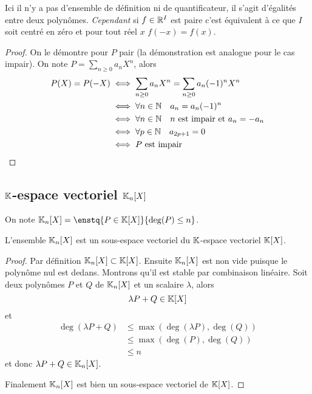 \danger Ici il n'y a pas d'ensemble de définition ni de quantificateur, il s'agit d'égalités entre deux polynômes. \emph{Cependant} si $f \in \mathbb{R}^I$ est paire c'est équivalent à ce que $I$ soit centré en zéro et pour tout réel $x$ $f(-x)=f(x)$.

\begin{proof}
  On le démontre pour $P$ pair (la démonstration est analogue pour le cas impair). On note $P = \sum_{n\geq 0} a_n X^n$, alors
  \begin{align}
    P(X) = P(-X) &\iff \sum_{n \geq 0} a_n X^n = \sum_{n \geq 0} a_n (-1)^n X^n\\
    &\iff \forall n \in \mathbb{N} \quad a_n=a_n(-1)^n\\
    &\iff \forall n \in \mathbb{N} \quad n \text{~est impair et~} a_n=-a_n\\
    &\iff \forall p \in \mathbb{N} \quad a_{2p+1}=0\\
    &\iff P \text{~est impair}
  \end{align}
\end{proof}

\subsection{$\mathbb{K}$-espace vectoriel $\mathbb{K}_n[X]$}

On note $\K_n[X]=\enstq{P \in \K[X]}{\deg(P) \leq n}$.

\begin{prop}
  L'ensemble $\mathbb{K}_n[X]$ est un sous-espace vectoriel du $\mathbb{K}$-espace vectoriel $\mathbb{K}[X]$.
\end{prop}
\begin{proof}
  Par définition $\mathbb{K}_n[X] \subset \mathbb{K}[X]$. Ensuite $\mathbb{K}_n[X]$ est non vide puisque le polynôme nul est dedans. Montrons qu'il est stable par combinaison linéaire. Soit deux polynômes $P$ et $Q$ de $\mathbb{K}_n[X]$ et un scalaire $\lambda$, alors
  \begin{equation}
    \lambda P +Q \in \mathbb{K}[X]
  \end{equation}
  et
  \begin{align}
    \deg(\lambda P+Q) &\leq \max(\deg(\lambda P),\deg(Q))\\
    &\leq \max(\deg(P),\deg(Q))\\
    &\leq n
  \end{align}
  et donc $\lambda P +Q \in \mathbb{K}_n[X]$.

  Finalement $\mathbb{K}_n[X]$ est bien un sous-espace vectoriel de $\mathbb{K}[X]$. 
\end{proof}

